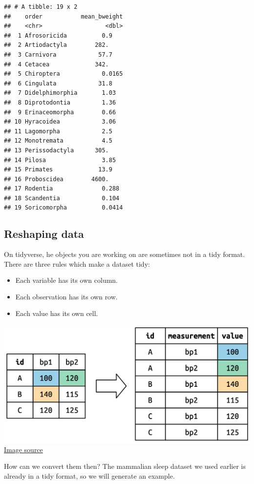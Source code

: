 \documentclass[
]{book}
\providecommand{\tightlist}{%
  \setlength{\itemsep}{0pt}\setlength{\parskip}{0pt}}
\begin{document}
\begin{verbatim}
## # A tibble: 19 x 2
##    order           mean_bweight
##    <chr>                  <dbl>
##  1 Afrosoricida          0.9   
##  2 Artiodactyla        282.    
##  3 Carnivora            57.7   
##  4 Cetacea             342.    
##  5 Chiroptera            0.0165
##  6 Cingulata            31.8   
##  7 Didelphimorphia       1.03  
##  8 Diprotodontia         1.36  
##  9 Erinaceomorpha        0.66  
## 10 Hyracoidea            3.06  
## 11 Lagomorpha            2.5   
## 12 Monotremata           4.5   
## 13 Perissodactyla      305.    
## 14 Pilosa                3.85  
## 15 Primates             13.9   
## 16 Proboscidea        4600.    
## 17 Rodentia              0.288 
## 18 Scandentia            0.104 
## 19 Soricomorpha          0.0414
\end{verbatim}

\hypertarget{reshaping-data}{%
\subsection*{Reshaping data}\label{reshaping-data}}

On tidyverse, he objects you are working on are sometimes not in a tidy format.
There are three rules which make a dataset tidy:

\begin{itemize}
\tightlist
\item
  Each variable has its own column.
\item
  Each observation has its own row.
\item
  Each value has its own cell.
\end{itemize}

\includegraphics{figures/tidyexp.png} \href{https://r4ds.hadley.nz/data-tidy.html}{Image source}

How can we convert them then?
The mammalian sleep dataset we used earlier is already in a tidy format, so we will generate an example.
\end{document}
